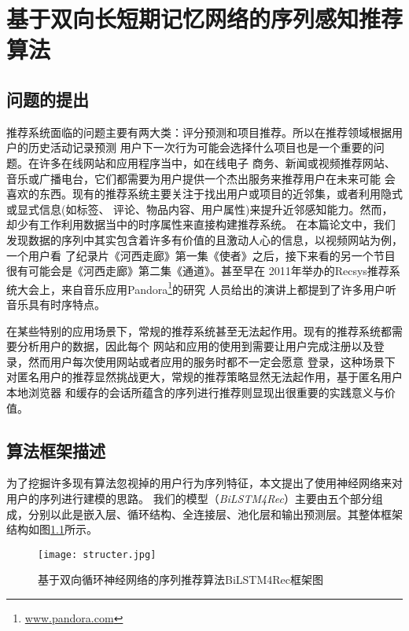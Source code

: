﻿%
\chapter{基于双向长短期记忆网络的序列感知推荐算法}

\section{问题的提出}
推荐系统面临的问题主要有两大类：评分预测和项目推荐。所以在推荐领域根据用户的历史活动记录预测%
用户下一次行为可能会选择什么项目也是一个重要的问题。在许多在线网站和应用程序当中，如在线电子%
商务、新闻或视频推荐网站、音乐或广播电台，它们都需要为用户提供一个杰出服务来推荐用户在未来可能%
会喜欢的东西。现有的推荐系统主要关注于找出用户或项目的近邻集，或者利用隐式或显式信息(如标签、%
评论、物品内容、用户属性)来提升近邻感知能力。然而，却少有工作利用数据当中的时序属性来直接构建推荐系统。%
在本篇论文中，我们发现数据的序列中其实包含着许多有价值的且激动人心的信息，以视频网站为例，一个用户看%
了纪录片《河西走廊》第一集《使者》之后，接下来看的另一个节目很有可能会是《河西走廊》第二集《通道》。甚至早在%
2011年举办的Recsys推荐系统大会上，来自音乐应用Pandora\footnote{\url{www.pandora.com}}的研究%
人员给出的演讲上都提到了许多用户听音乐具有时序特点。%

在某些特别的应用场景下，常规的推荐系统甚至无法起作用。现有的推荐系统都需要分析用户的数据，因此每个%
网站和应用的使用到需要让用户完成注册以及登录，然而用户每次使用网站或者应用的服务时都不一定会愿意%
登录，这种场景下对匿名用户的推荐显然挑战更大，常规的推荐策略显然无法起作用，基于匿名用户本地浏览器%
和缓存的会话所蕴含的序列进行推荐则显现出很重要的实践意义与价值。

\section{算法框架描述}

为了挖掘许多现有算法忽视掉的用户行为序列特征，本文提出了使用神经网络来对用户的序列进行建模的思路。%
我们的模型（\textit{BiLSTM4Rec}）主要由五个部分组成，分别以此是嵌入层、循环结构、全连接层、池化层和输出预测层。其整体框架%
结构如图\ref{fig:structer}所示。

\begin{figure}[htb]
  \centering
  \texttt{[image: structer.jpg]}\\
  \caption{基于双向循环神经网络的序列推荐算法BiLSTM4Rec框架图}
  \label{fig:structer}
\end{figure}

